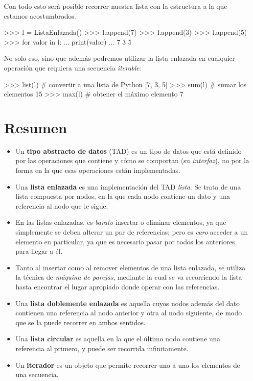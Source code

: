 Con todo esto será posible recorrer nuestra lista con la estructura a la
que estamos acostumbrados.

\begin{codigo-python-sn}
>>> l = ListaEnlazada()
>>> l.append(7)
>>> l.append(3)
>>> l.append(5)
>>> for valor in l:
...     print(valor)
...
7
3
5
\end{codigo-python-sn}

No solo eso, sino que además podremos utilizar la lista enlazada en cualquier
operación que requiera una secuencia {\it iterable}:

\begin{codigo-python-sn}
>>> list(l) # convertir a una lista de Python
[7, 3, 5]
>>> sum(l) # sumar los elementos
15
>>> max(l) # obtener el máximo elemento
7
\end{codigo-python-sn}

\section{Resumen}

\begin{itemize}

\item Un {\bf tipo abstracto de datos} (TAD) es un tipo de datos que está
definido por las operaciones que contiene y cómo se comportan (su {\it
interfaz}), no por la forma en la que esas operaciones están implementadas.

\item Una {\bf lista enlazada} es una implementación del TAD {\it lista}.
Se trata de una lista compuesta por nodos, en la que
cada nodo contiene un dato y una referencia al nodo que le sigue.

\item En las listas enlazadas, es {\it barato} insertar o eliminar
elementos, ya que simplemente se deben alterar un par de referencias; pero
es {\it caro} acceder a un elemento en particular, ya que es necesario
pasar por todos los anteriores para llegar a él.

\item Tanto al insertar como al remover elementos de una lista enlazada, se
utiliza la técnica de {\it máquina de parejas}, mediante la cual se va
recorriendo la lista hasta encontrar el lugar apropiado donde operar con
las referencias.

\item Una {\bf lista doblemente enlazada} es aquella cuyos nodos además del
dato contienen una referencia al nodo anterior y otra al nodo siguiente, de
modo que se la puede recorrer en ambos sentidos.

\item Una {\bf lista circular} es aquella en la que el último nodo contiene
una referencia al primero, y puede ser recorrida infinitamente.

\item Un {\bf iterador} es un objeto que permite recorrer uno a uno los
elementos de una secuencia.

\end{itemize}


